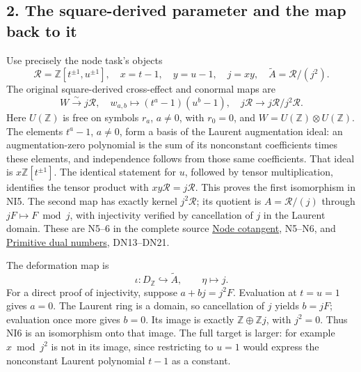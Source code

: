 \documentclass[
]{article}
\begin{document}
\subsection{2. The square-derived parameter and the map back to
it}\label{the-square-derived-parameter-and-the-map-back-to-it}

Use precisely the node task's objects \[
\mathcal R=\mathbb Z[t^{\pm1},u^{\pm1}],\quad x=t-1,\quad y=u-1,
\quad j=xy,\quad \widetilde A=\mathcal R/(j^2).
\] The original square-derived cross-effect and conormal maps are \[
W\xrightarrow{\sim}j\mathcal R,\quad
w_{a,b}\longmapsto(t^a-1)(u^b-1),
\quad
j\mathcal R\longrightarrow j\mathcal R/j^2\mathcal R.
\tag{NI5}
\] Here \(U(\mathbb Z)\) is free on symbols \(r_a\), \(a\ne0\), with
\(r_0=0\), and \(W=U(\mathbb Z)\otimes U(\mathbb Z)\). The elements
\(t^a-1\), \(a\ne0\), form a basis of the Laurent augmentation ideal: an
augmentation-zero polynomial is the sum of its nonconstant coefficients
times these elements, and independence follows from those same
coefficients. That ideal is \(x\mathbb Z[t^{\pm1}]\). The identical
statement for \(u\), followed by tensor multiplication, identifies the
tensor product with \(xy\mathcal R=j\mathcal R\). This proves the first
isomorphism in NI5. The second map has exactly kernel \(j^2\mathcal R\);
its quotient is \(A=\mathcal R/(j)\) through \(jF\mapsto F\bmod j\),
with injectivity verified by cancellation of \(j\) in the Laurent
domain. These are N5--6 in the complete source
\href{https://github.com/KokunoYumeto/zeta-function-research-reader/blob/6af54ea3c8ef99127af327f3103e086c68d482c2/workbenches/splitzero-tandem/branches/identity-absorber-square/NODE_COTANGENT.md}{Node
cotangent}, N5--N6, and
\href{https://github.com/KokunoYumeto/zeta-function-research-reader/blob/6af54ea3c8ef99127af327f3103e086c68d482c2/workbenches/splitzero-tandem/branches/identity-absorber-square/PRIMITIVE_DUAL_NUMBERS.md}{Primitive
dual numbers}, DN13--DN21.

The deformation map is \[
\iota:D_{\mathbb Z}\hookrightarrow\widetilde A,
\qquad \eta\longmapsto j.
\tag{NI6}
\] For a direct proof of injectivity, suppose \(a+bj=j^2F\). Evaluation
at \(t=u=1\) gives \(a=0\). The Laurent ring is a domain, so
cancellation of \(j\) yields \(b=jF\); evaluation once more gives
\(b=0\). Its image is exactly \(\mathbb Z\oplus\mathbb Zj\), with
\(j^2=0\). Thus NI6 is an isomorphism onto that image. The full target
is larger: for example \(x\bmod j^2\) is not in its image, since
restricting to \(u=1\) would express the nonconstant Laurent polynomial
\(t-1\) as a constant.
\end{document}
